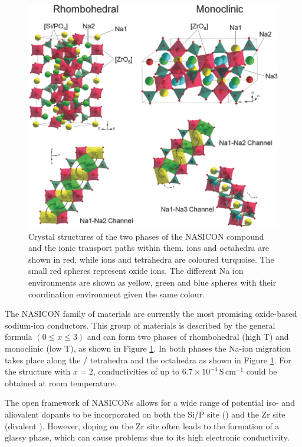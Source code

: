 \documentclass[12pt]{report}
\begin{document}
\begin{figure}[h!]
\centering
\includegraphics[width=12cm]{./figures/nasicon.jpg}
\caption{Crystal structures of the two phases of the  NASICON compound and the ionic transport paths within them.  ions and  octahedra are shown in red, while  ions and  tetrahedra are coloured turquoise. The small red spheres represent oxide ions. The different Na ion environments are shown as yellow, green and blue spheres with their coordination environment given the same colour. \cite{zhao2018}}
\label{nasicon}
\end{figure}

The NASICON family of materials are currently the most promising oxide-based sodium-ion conductors.\cite{goodenough1976, hong1976}
This group of materials is described by the general formula  $(0 \leq x \leq 3)$ and can form two phases of rhombohedral (high T) and monoclinic (low T), as shown in Figure \ref{nasicon}. 
In both phases the Na-ion migration takes place along the / tetrahedra and the  octahedra as shown in Figure \ref{nasicon}.
For the structure with $x = 2$, conductivities of up to $6.7 \times 10^{-4} \, \mathrm{S \, cm^{-1}}$ could be obtained at room temperature.\cite{goodenough1976}

The open framework of NASICONs allows for a wide range of potential iso- and aliovalent dopants to be incorporated on both the Si/P site () and the Zr site (divalent ).
However, doping on the Zr site often leads to the formation of a glassy phase, which can cause problems due to its high electronic conductivity.\cite{anantharamulu2011, kreuer1989, vogel1984, ma2016, krok1989, takahashi1980, guin2015}
\end{document}
